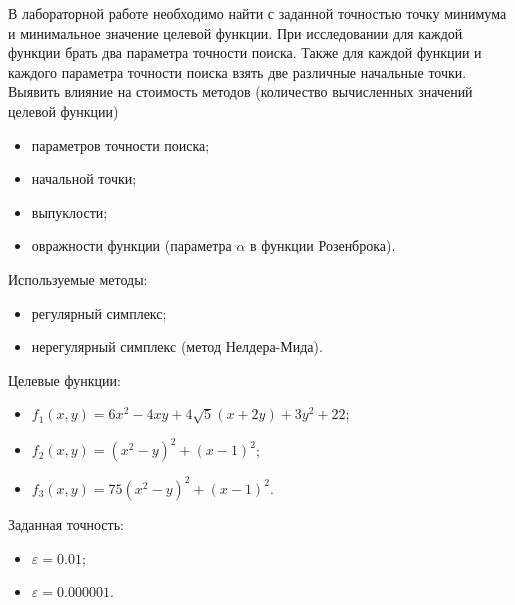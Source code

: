 \documentclass[12pt, a4paper]{article}
\begin{document}
В лабораторной работе необходимо найти с заданной точностью точку минимума и минимальное значение целевой функции. При исследовании для каждой функции брать два параметра точности поиска. Также для каждой функции и каждого параметра точности поиска взять две различные начальные точки. Выявить влияние на стоимость методов (количество вычисленных значений целевой функции)
\begin{itemize}
	\item параметров точности поиска;
	\item начальной точки;
	\item выпуклости;
	\item овражности функции (параметра $\alpha$ в функции Розенброка).
\end{itemize}
Используемые методы:
\begin{itemize}
	\item регулярный симплекс;
	\item нерегулярный симплекс (метод Нелдера-Мида).
\end{itemize}
Целевые функции:
\begin{itemize}
	\item $f_1(x,y)=6 x^2-4 x y+4 \sqrt{5} (x+2 y)+3 y^2+22$;
	\item  $f_2(x,y)=\left(x^2-y\right)^2+(x-1)^2$;
	\item  $f_3(x,y)=75\left(x^2-y\right)^2+(x-1)^2$.
\end{itemize}
Заданная точность: 
\begin{itemize}
	\item $\varepsilon=0.01$;
	\item $\varepsilon=0.000001$.
\end{itemize}
\newpage
\end{document}
